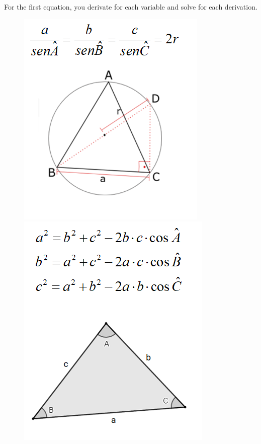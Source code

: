     For the first equation, you derivate for each variable and solve for each derivation.
    
    \begin{figure}[ht]
    \begin{center}
    \begin{minipage}{.48\textwidth}
        \centering
        \includegraphics[scale=0.7]{imgs/leidossenos.png}
    \end{minipage}
    \begin{minipage}{.48\textwidth}
    \centering
        \includegraphics[scale=0.7]{imgs/leidoscosenos.png}
    \end{minipage}
    \end{center}
    \end{figure}
